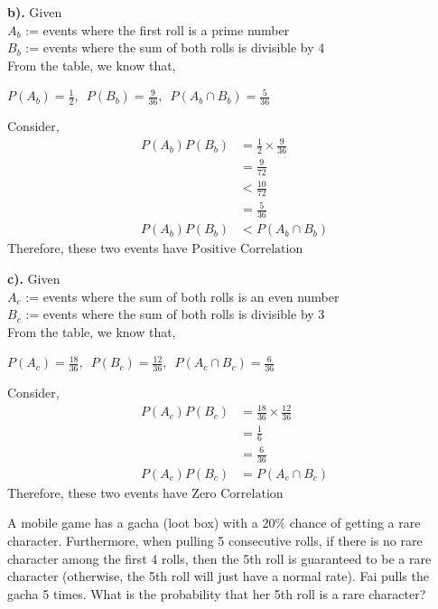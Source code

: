 \documentclass[a4paper, 10pt]{article}
\begin{document}
\begin{tosubmit}
\par\noindent\textbf{b).} Given \\
\( A_b \) := events where the first roll is a prime number \\
\( B_b \) := events where the sum of both rolls is divisible by 4 \\
From the table, we know that,
\begin{center}
    \( P(A_b) = \frac{1}{2},\enspace P(B_b) = \frac{9}{36},\enspace P(A_b \cap B_b) = \frac{5}{36} \)
\end{center}
Consider,
\begin{align*}
    \allowbreak
    P(A_b)P(B_b) &= \frac{1}{2}\times\frac{9}{36} \\
    &= \frac{9}{72} \\
    &< \frac{10}{72} \\
    &= \frac{5}{36} \\
    P(A_b)P(B_b) &< P(A_b \cap B_b)
\end{align*}
Therefore, these two events have \( \boxed{\text{Positive Correlation}} \) \\

\par\noindent\textbf{c).} Given \\
\( A_c \) := events where the sum of both rolls is an even number \\
\( B_c \) := events where the sum of both rolls is divisible by 3 \\
From the table, we know that,
\begin{center}
    \( P(A_c) = \frac{18}{36},\enspace P(B_c) = \frac{12}{36},\enspace P(A_c \cap B_c) = \frac{6}{36} \)
\end{center}
Consider,
\begin{align*}
    P(A_c)P(B_c) &= \frac{18}{36}\times\frac{12}{36} \\
    &= \frac{1}{6} \\
    &= \frac{6}{36} \\
    P(A_c)P(B_c) &= P(A_c \cap B_c)
\end{align*}
Therefore, these two events have \( \boxed{\text{Zero Correlation}} \)
\end{tosubmit}


\begin{problem}
A mobile game has a gacha (loot box) with a 20\% chance of getting a rare character.
Furthermore, when pulling 5 consecutive rolls, if there is no rare character among the first 4 rolls,
then the 5th roll is guaranteed to be a rare character (otherwise, the 5th roll will just have a normal rate).
Fai pulls the gacha 5 times. What is the probability that her 5th roll is a rare character?
\end{problem}
\end{document}

